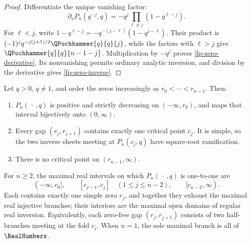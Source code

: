 \begin{proof}
Differentiate the unique vanishing factor:
\[
 \partial_aP_n(q^{-j},q)
 =-q^j\prod_{\ell\ne j}(1-q^{\ell-j}).
\]
For \(\ell<j\), write
\(1-q^{\ell-j}=-q^{-(j-\ell)}(1-q^{j-\ell})\).  Their product is
\((-1)^jq^{-j(j+1)/2}\QPochhammer{q}{q}{j}\), while the factors with
\(\ell>j\) give \(\QPochhammer{q}{q}{n-1-j}\).  Multiplication by \(-q^j\) proves
\cref{fp-zero-derivative}.  Its nonvanishing permits ordinary analytic
inversion, and division by the derivative gives \cref{fp-zero-inverse}.
\end{proof}

\begin{theorem}
\label{fp-real-atlas}
Let \(q>0\), \(q\ne1\), and order the zeros increasingly as
\(r_0<\cdots<r_{n-1}\).  Then:
\begin{enumerate}
\item \(P_n(\,\cdot\,,q)\) is positive and strictly decreasing on
  \((-\infty,r_0)\), and maps that interval bijectively onto
  \((0,\infty)\).
\item Every gap \((r_j,r_{j+1})\) contains exactly one critical point
  \(c_j\).  It is simple, so the two inverse sheets meeting at
  \(P_n(c_j,q)\) have square-root ramification.
\item There is no critical point on \((r_{n-1},\infty)\).
\end{enumerate}
For \(n\ge2\), the maximal real intervals on which
\(P_n(\,\cdot\,,q)\) is one-to-one are
\[
 (-\infty,c_0],\qquad
 [c_{j-1},c_j]\quad(1\leq j\leq n-2),\qquad
 [c_{n-2},\infty).
\]
Each contains exactly one simple zero \(r_j\), and together they exhaust the
maximal real injective branches; their interiors are the maximal open domains
of regular real inversion.  Equivalently, each zero-free gap
\((r_j,r_{j+1})\) consists of two half-branches meeting at the fold \(c_j\).
When \(n=1\), the sole maximal branch is all of \(\RealNumbers\).
\end{theorem}

